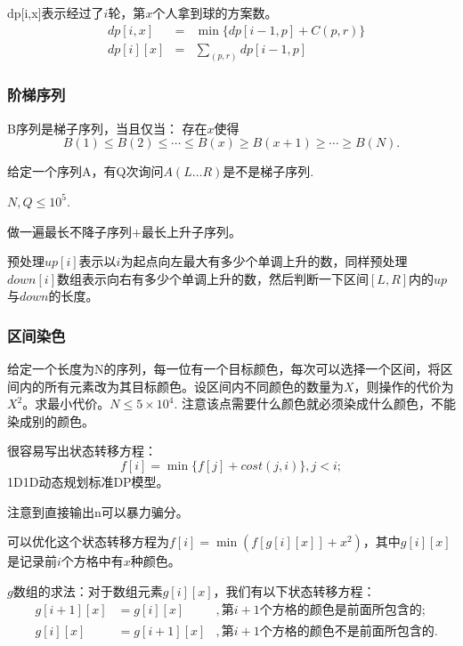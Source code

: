 dp[i,x]表示经过了$i$轮，第$x$个人拿到球的方案数。
\begin{equation*}
    \begin{aligned}
        &dp[i,x]&=&\min\{dp[i-1,p]+C(p,r)\}\\
        &dp[i][x]&=&\sum_{(p,r)} dp[i-1,p]
    \end{aligned}
\end{equation*}
\subsubsection{阶梯序列}
B序列是梯子序列，当且仅当：
存在$x$使得
\begin{equation*}
    B(1)\le B(2)\le\cdots\le B(x)\ge B(x+1)\ge\cdots\ge B(N).
\end{equation*}

给定一个序列A，有Q次询问$A(L\ldots R)$是不是梯子序列.

$N,Q\le 10^5$.

做一遍最长不降子序列+最长上升子序列。

预处理$up[i]$表示以$i$为起点向左最大有多少个单调上升的数，同样预处理$down[i]$数组表示向右有多少个单调上升的数，然后判断一下区间$[L,R]$内的$up$与$down$的长度。

\subsubsection{区间染色}
给定一个长度为N的序列，每一位有一个目标颜色，每次可以选择一个区间，将区间内的所有元素改为其目标颜色。设区间内不同颜色的数量为$X$，则操作的代价为$X^2$。求最小代价。$N\le 5\times 10^4.$ 注意该点需要什么颜色就必须染成什么颜色，不能染成别的颜色。

很容易写出状态转移方程：
\begin{equation*}
    f[i]=\min\{f[j]+cost(j,i)\},j<i;
\end{equation*}
1D1D动态规划标准DP模型。

注意到直接输出n可以暴力骗分。

可以优化这个状态转移方程为$f[i]=\min(f[g[i][x]]+x^2)$，其中$g[i][x]$是记录前$i$个方格中有$x$种颜色。

$g$数组的求法：对于数组元素$g[i][x]$，我们有以下状态转移方程：
\begin{equation*}
    \begin{aligned}
        &g[i+1][x]&=g[i][x]&,第i+1个方格的颜色是前面所包含的;\\
        &g[i][x]&=g[i+1][x]&,第i+1个方格的颜色不是前面所包含的.
    \end{aligned}
\end{equation*}
